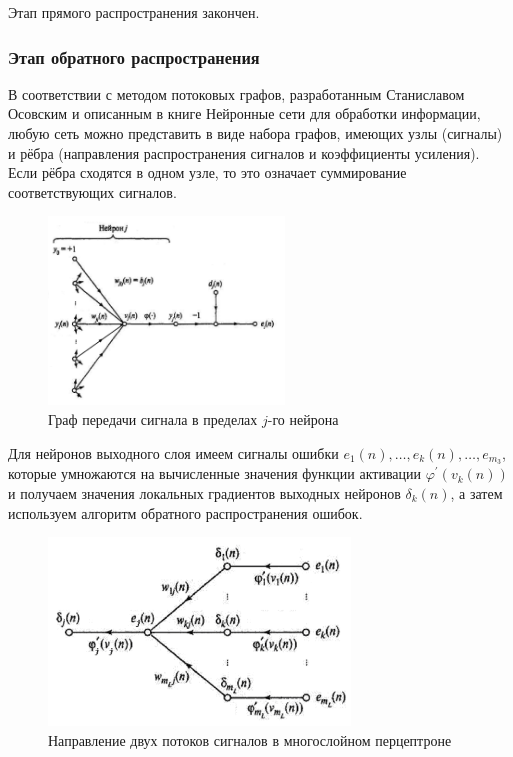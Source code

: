 \documentclass{article}
\numberwithin{equation}{subsection}
\begin{document}
Этап прямого распространения закончен.




\subsubsection{Этап обратного распространения}

В соответствии с методом потоковых графов, разработанным Станиславом Осовским и описанным в книге
\glqq Нейронные сети для обработки информации\grqq, любую сеть можно представить в виде набора графов,
 имеющих узлы (сигналы) и рёбра (направления распространения сигналов и коэффициенты усиления).
Если рёбра сходятся в одном узле, то это означает суммирование соответствующих сигналов.

\begin{figure}[H]
    \centering
    \includegraphics[height=5cm]{lec_neuro_08_4_3.png}
    \caption{Граф передачи сигнала в пределах $j$-го нейрона}
    \label{lec_neuro_08_4_3}
\end{figure}

Для нейронов выходного слоя имеем сигналы ошибки $e_1(n),\dots,e_k(n),\dots,e_{m_3}$, которые 
умножаются на вычисленные значения функции активации $\varphi^{\prime}(v_k(n))$ и получаем значения 
локальных градиентов выходных нейронов $\delta_k(n)$, а затем используем алгоритм обратного 
распространения ошибок.

\begin{figure}[htbp]
    \centering
    \includegraphics[height=5cm]{lec_neuro_08_4_5.png}
    \caption{Направление двух потоков сигналов в многослойном перцептроне}
    \label{lec_neuro_08_4_5}
\end{figure}
\end{document}
